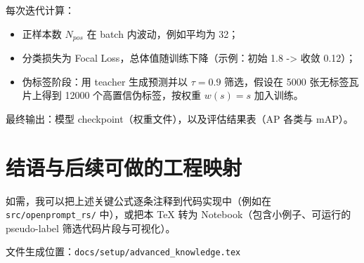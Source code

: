 \documentclass[11pt,a4paper]{article}
\begin{document}
每次迭代计算：
\begin{itemize}
  \item 正样本数 $N_{pos}$ 在 batch 内波动，例如平均为 32；
  \item 分类损失为 Focal Loss，总体值随训练下降（示例：初始 1.8 -> 收敛 0.12）；
  \item 伪标签阶段：用 teacher 生成预测并以 $\tau=0.9$ 筛选，假设在 5000 张无标签瓦片上得到 12000 个高置信伪标签，按权重 $w(s)=s$ 加入训练。
\end{itemize}

最终输出：模型 checkpoint（权重文件），以及评估结果表（AP 各类与 mAP）。

\section*{结语与后续可做的工程映射}
如需，我可以把上述关键公式逐条注释到代码实现中（例如在 \texttt{src/openprompt\_rs/} 中），或把本 TeX 转为 Notebook（包含小例子、可运行的 pseudo-label 筛选代码片段与可视化）。

\vfill
\noindent 文件生成位置：\texttt{docs/setup/advanced_knowledge.tex}
\end{document}
